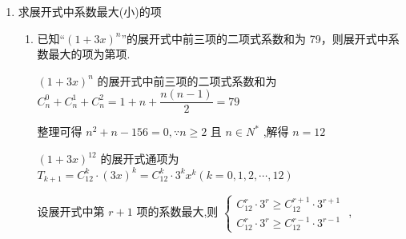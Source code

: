 \begin{enumerate}
\begin{enumerate}
\begin{jieda}
\begin{enumerate}
                因为第 6 项为常数项,所以 $r = 5$ 时,有 $\dfrac{n - {2r}}{3} = 0$ ,解得 $n = {10}$ .
                
                \item 由(1)可知 $n = {10}$ ，令 $\dfrac{n - {2r}}{3} = 2$ ，解得 $r = 2$ . 所以含 ${x}^{2}$ 项的系数为 ${\left( -3\right) }^{2} \cdot  {C}_{10}^{2} = {405}$ .
                
                \item 由题意可知, $\left\{  \begin{matrix} \dfrac{{10} - {2r}}{3} \in  Z \\  0 \leq  r \leq  {10}, \\  r \in  N \end{matrix}\right.$ 则 $r$ 可能的取值为2,5,8.
                
                所以第 3 项，第 6 项，第 9 项为有理项，分别为 ${C}_{10}^{2} \cdot  {\left( -3\right) }^{2} \cdot  {x}^{2},{C}_{10}^{5} \cdot  {\left( -3\right) }^{5},{C}_{10}^{8} \cdot  {\left( -3\right) }^{8} \cdot  {x}^{-2}$.
            \end{enumerate}
        \end{jieda}
    \end{enumerate}

    \item 求展开式中系数最大(小)的项
    \begin{enumerate}
        \item 已知“$(1+3x)^n$”的展开式中前三项的二项式系数和为 79，则展开式中系数最大的项为第项.
        \begin{jieda}
            ${\left( 1 + 3x\right) }^{n}$ 的展开式中前三项的二项式系数和为 ${{C}}_{n}^{0} + {{C}}_{n}^{1} + {{C}}_{n}^{2} = 1 + n + \dfrac{n\left( {n - 1}\right) }{2} = {79}$
            
            整理可得 ${n}^{2} + n - {156} = 0,\because n \geq  2$ 且 $n \in  {N}^{ * }$ ,解得 $n = {12}$
            
            ${\left( 1 + 3x\right) }^{12}$ 的展开式通项为 ${T}_{k + 1} = {{C}}_{12}^{k} \cdot  {\left( 3x\right) }^{k} = {{C}}_{12}^{k} \cdot  {3}^{k}{x}^{k}\left( {k = 0,1,2,\cdots ,{12}}\right)$
            
            设展开式中第 $r + 1$ 项的系数最大,则 $\left\{  \begin{array}{l} {{C}}_{12}^{r} \cdot  {3}^{r} \geq  {{C}}_{12}^{r + 1} \cdot  {3}^{r + 1} \\  {{C}}_{12}^{r} \cdot  {3}^{r} \geq  {{C}}_{12}^{r - 1} \cdot  {3}^{r - 1} \end{array}\right.$ ,
            

\end{jieda}
\end{enumerate}
\end{enumerate}
